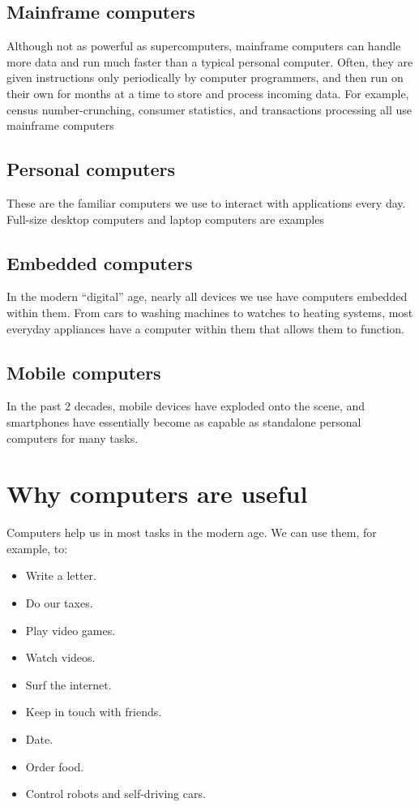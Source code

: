 \subsection{Mainframe computers}
Although not as powerful as supercomputers, mainframe computers can handle more data and run much faster than a typical personal computer. Often, they are given instructions only periodically by computer programmers, and then run on their own for months at a time to store and process incoming data. For example, census number-crunching, consumer statistics, and transactions processing all use mainframe computers

\subsection{Personal computers}
These are the familiar computers we use to interact with applications every day. Full-size desktop computers and laptop computers are examples

\subsection{Embedded computers}
In the modern ``digital'' age, nearly all devices we use have computers embedded within them. From cars to washing machines to watches to heating systems, most everyday appliances have a computer within them that allows them to function.

\subsection{Mobile computers}
In the past 2 decades, mobile devices have exploded onto the scene, and smartphones have essentially become as capable as standalone personal computers for many tasks.

\section{Why computers are useful}

Computers help us in most tasks in the modern age. We can use them, for example, to:

\begin{itemize}
	\item Write a letter.
	\item Do our taxes.
	\item Play video games.
	\item Watch videos.
	\item Surf the internet.
	\item Keep in touch with friends.
	\item Date.
	\item Order food.
	\item Control robots and self-driving cars.
\end{itemize}

